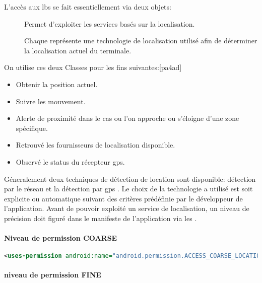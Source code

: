 L’accès aux \gls{lbs} se fait essentiellement via deux objets:
\begin{description}
\item [] Permet d'exploiter les services basés sur la localisation.
\item [] Chaque  représente une technologie de localisation utilisé afin de déterminer la localisation actuel du terminale.

\end{description}
On utilise ces deux Classes pour les fins suivantes:[pa4ad]
\begin{itemize}
\item Obtenir la position actuel.
\item Suivre les mouvement.
\item Alerte de proximité dans le cas ou l'on approche ou s’éloigne d'une zone spécifique.
\item Retrouvé les fournisseurs de localisation disponible.
\item Observé le status du récepteur \gls{gps}.
\end{itemize}
\cite{pa4ad:lbs}
Géneralement deux techniques de détection de location sont disponible: détection par le réseau  et la détection par \gls{gps} . Le choix de la technologie a utilisé est soit explicite ou automatique suivant des critères prédéfinie par le développeur de l'application. Avant de pouvoir exploité un service de localisation, un niveau de précision doit figuré dans le manifeste de l'application via les  .

\paragraph{Niveau de permission \textsc{COARSE} } %
\label{par:coarse}

\begin{lstlisting}[language=xml, caption=permission pour la localisation par le réseau.]
<uses-permission android:name="android.permission.ACCESS_COARSE_LOCATION"/>
\end{lstlisting}

\paragraph{niveau de permission \textsc{FINE} } %
\label{par:fine}

